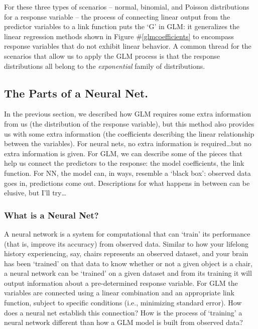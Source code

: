 \documentclass[12pt]{article}\usepackage[]{graphicx}\usepackage[]{color}
\begin{document}
For these three types of scenarios -- normal, binomial, and Poisson distributions for a response variable -- the process of connecting linear 
output from the predictor variables to a link function puts the `G' in GLM:  it generalizes the linear regression methods shown in Figure \#\ref{glmcoefficients} to
encompass response variables that do not exhibit linear behavior.  A common thread for the scenarios that allow us to apply the GLM process is that the 
response distributions all belong to the \textit{exponential} family of distributions.

\subsection{The Parts of a Neural Net.}

In the previous section, we described how GLM requires some extra information from us (the distribution of the response variable), but this method
also provides us with some extra information (the coefficients describing the linear relationship between the variables).  For neural nets, no 
extra information is required\dots but no extra information is given.  For GLM, we can describe some of the pieces that help us connect the 
predictors to the response:  the model coefficients, the link function.  For NN, the model can, in ways, resemble a `black box':  observed data
goes in, predictions come out.  Descriptions for what happens in between can be elusive, but I'll try\dots

\subsubsection{What is a Neural Net?}
A neural network is a system for computational that can `train' its performance (that is, improve its accuracy) from observed data.  Similar to how your lifelong history experiencing, say, chairs represents an observed dataset, and your brain has been `trained' on that data to know whether or not a given object is a chair,  a neural network can be `trained' on a given dataset and from its training it will output information about a pre-determined response variable.   For GLM the variables are connected using a linear combination and an appropriate link function, subject to specific conditions (i.e., minimizing standard error).  How does a neural net establish this connection?  How is the process of `training' a neural network different than how a GLM model is built from observed data?  
\end{document}
